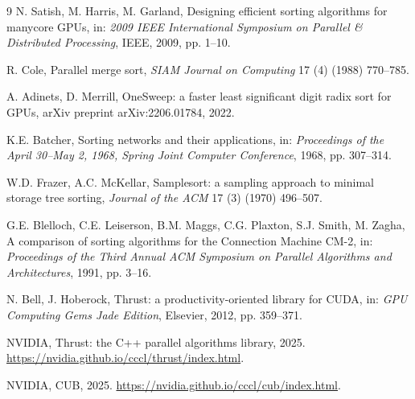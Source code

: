 \begin{chapterbibliography}{9}
  N. Satish, M. Harris, M. Garland, Designing efficient sorting algorithms for
  manycore GPUs, in: \emph{2009 IEEE International Symposium on Parallel \&
  Distributed Processing}, IEEE, 2009, pp. 1--10.

  R. Cole, Parallel merge sort, \emph{SIAM Journal on Computing} 17 (4) (1988)
  770--785.

  A. Adinets, D. Merrill, OneSweep: a faster least significant digit radix sort
  for GPUs, arXiv preprint arXiv:2206.01784, 2022.

  K.E. Batcher, Sorting networks and their applications, in: \emph{Proceedings
  of the April 30--May 2, 1968, Spring Joint Computer Conference}, 1968,
  pp. 307--314.

  W.D. Frazer, A.C. McKellar, Samplesort: a sampling approach to minimal storage
  tree sorting, \emph{Journal of the ACM} 17 (3) (1970) 496--507.

  G.E. Blelloch, C.E. Leiserson, B.M. Maggs, C.G. Plaxton, S.J. Smith,
  M. Zagha, A comparison of sorting algorithms for the Connection Machine CM-2,
  in: \emph{Proceedings of the Third Annual ACM Symposium on Parallel Algorithms
  and Architectures}, 1991, pp. 3--16.

  N. Bell, J. Hoberock, Thrust: a productivity-oriented library for CUDA,
  in: \emph{GPU Computing Gems Jade Edition}, Elsevier, 2012, pp. 359--371.

  NVIDIA, Thrust: the C++ parallel algorithms library, 2025.
  \url{https://nvidia.github.io/cccl/thrust/index.html}.

  NVIDIA, CUB, 2025.
  \url{https://nvidia.github.io/cccl/cub/index.html}.
\end{chapterbibliography}
